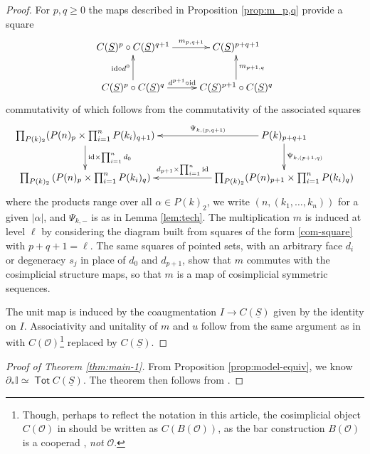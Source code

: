 \documentclass[12pt]{amsart}
\theoremstyle{definition}
\theoremstyle{remark}
\newcommand{\Tot}{\operatorname{\mathsf{Tot}}}
\newcommand{\id}{\mathrm{id}}
\newcommand{\Id}{\mathbb{I}}
\newcommand{\Cal}[1]{\mathcal{#1}}
\newcommand{\uS}{\underline{S}}
\begin{document}
\begin{proof}
    For $p,q\geq 0$ the maps described in Proposition \ref{prop:m_p,q} provide a square \begin{equation} \label{com-square} \xymatrix{ 
        C(\uS)^p \circ C(\uS)^{q+1} \ar[r]^-{m_{p,q+1}}
        &
        C(\uS)^{p+q+1}
        \\
        C(\uS)^p\circ C(\uS)^{q} \ar[u]^-{\id \circ d^0} \ar[r]^-{d^{p+1} \circ \id}
        &
        C(\uS)^{p+1} \circ C(\uS)^{q} \ar[u]_-{m_{p+1,q}}
    }\end{equation}
    commutativity of which follows from the commutativity of the associated squares \[ \xymatrix{
    \prod_{P(k)_2} (P(n)_{p}\times \prod_{i=1}^n P(k_i)_{q+1} )\ar[d]^-{\id \times \prod_{i=1}^n d_0}
    &&
    P(k)_{p+q+1} \ar[ll]_-{\Psi_{k,(p,q+1)}} \ar[d]^-{\Psi_{k,(p+1,q)}}
    \\
    \prod_{P(k)_2} \left(P(n)_{p} \times \prod_{i=1}^n P(k_i)_{q} \right)
    & &
    \prod_{P(k)_2} (P(n)_{p+1}\times \prod_{i=1}^n P(k_i)_{q}) \ar[ll]_-{d_{p+1} \times \prod_{i=1}^n \id}
    }\] where the products range over all $\alpha\in P(k)_2$, we write $(n,(k_1,\dots,k_n))$ for a given $|\alpha|$, and $\Psi_{k,-}$ is as in Lemma \ref{lem:tech}. The multiplication $m$ is induced at level $\ell$ by considering the diagram built from squares of the form \eqref{com-square} with $p+q+1=\ell$. The same squares of pointed sets, with an arbitrary face $d_i$ or degeneracy $s_j$ in place of $d_0$ and $d_{p+1}$, show that $m$ commutes with the cosimplicial structure maps, so that $m$ is a map of cosimplicial symmetric sequences. 

    The unit map is induced by the coaugmentation $I\to C(\uS)$ given by the identity on $I$. Associativity and unitality of $m$ and $u$ follow from the same argument as in \cite[Proposition 5.8]{Clark-1} with $C(\Cal{O})$\footnote{Though, perhaps to reflect the notation in this article, the cosimplicial object $C(\Cal{O})$ in \cite{Clark-1} should be written as $C(B(\Cal{O}))$, as the bar construction $B(\Cal{O})$ is a cooperad \cite{Ching-thesis}, \textit{not} $\Cal{O}$.} replaced by $C(\uS)$.
\end{proof}


\begin{proof}[Proof of Theorem \ref{thm:main-1}]
    From Proposition \ref{prop:model-equiv}, we know $\partial_* \Id \simeq \Tot C(\uS)$. The theorem then follows from \cite[Proposition 5.9]{Clark-1}.
\end{proof}
\end{document}
